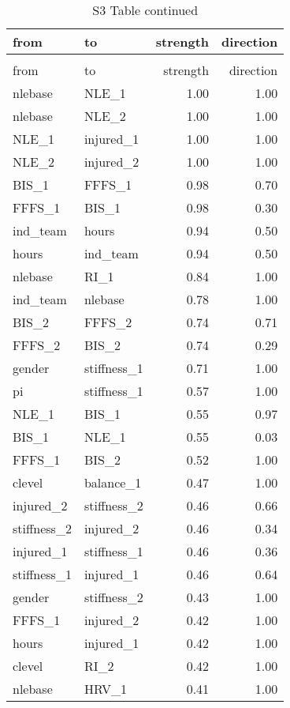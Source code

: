 \documentclass[
]{article}
\begin{document}
\begin{longtable}[t]{l|l|r|r}
\caption{\label{tab:unnamed-chunk-2}}\\
\hline
from & to & strength & direction\\
\hline
\endfirsthead
\caption[]{ S3 Table continued}\\
\hline
from & to & strength & direction\\
\hline
\endhead
nlebase & NLE\_1 & 1.00 & 1.00\\
\hline
nlebase & NLE\_2 & 1.00 & 1.00\\
\hline
NLE\_1 & injured\_1 & 1.00 & 1.00\\
\hline
NLE\_2 & injured\_2 & 1.00 & 1.00\\
\hline
BIS\_1 & FFFS\_1 & 0.98 & 0.70\\
\hline
FFFS\_1 & BIS\_1 & 0.98 & 0.30\\
\hline
ind\_team & hours & 0.94 & 0.50\\
\hline
hours & ind\_team & 0.94 & 0.50\\
\hline
nlebase & RI\_1 & 0.84 & 1.00\\
\hline
ind\_team & nlebase & 0.78 & 1.00\\
\hline
BIS\_2 & FFFS\_2 & 0.74 & 0.71\\
\hline
FFFS\_2 & BIS\_2 & 0.74 & 0.29\\
\hline
gender & stiffness\_1 & 0.71 & 1.00\\
\hline
pi & stiffness\_1 & 0.57 & 1.00\\
\hline
NLE\_1 & BIS\_1 & 0.55 & 0.97\\
\hline
BIS\_1 & NLE\_1 & 0.55 & 0.03\\
\hline
FFFS\_1 & BIS\_2 & 0.52 & 1.00\\
\hline
clevel & balance\_1 & 0.47 & 1.00\\
\hline
injured\_2 & stiffness\_2 & 0.46 & 0.66\\
\hline
stiffness\_2 & injured\_2 & 0.46 & 0.34\\
\hline
injured\_1 & stiffness\_1 & 0.46 & 0.36\\
\hline
stiffness\_1 & injured\_1 & 0.46 & 0.64\\
\hline
gender & stiffness\_2 & 0.43 & 1.00\\
\hline
FFFS\_1 & injured\_2 & 0.42 & 1.00\\
\hline
hours & injured\_1 & 0.42 & 1.00\\
\hline
clevel & RI\_2 & 0.42 & 1.00\\
\hline
nlebase & HRV\_1 & 0.41 & 1.00\\

\end{longtable}
\end{document}

